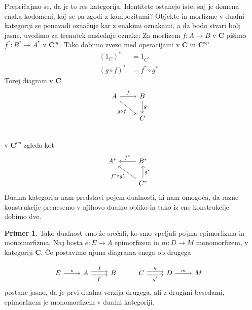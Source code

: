 \documentclass[12pt,a4paper]{book}
\theoremstyle{definition}
\theoremstyle{plain}
\theoremstyle{definition}
\newtheorem*{primer*}{Primer}
\theoremstyle{remark}
\newcommand{\cat}[1]{\textbf{#1}}
\begin{document}
Prepričajmo se, da je to res kategorija. Identitete ostanejo iste, saj je domena enaka kodomeni, kaj se pa zgodi z kompozitumi? Objekte in morfizme v dualni kategoriji se ponavadi označuje kar z enakimi oznakami, a da bodo stvari bolj jasne, uvedimo za trenutek naslednje oznake: Za morfizem $f : A \to B$ v $\cat{C}$ pišimo $f^* : B^* \to A^*$ v $\cat{C}^{op}$. Tako dobimo zvezo med operacijami v $\cat{C}$ in $\cat{C}^{op}$.
\begin{align*}
(1_C)^* &= 1_{C^*} \\
(g \circ f)^* &= f^* \circ g^*
\end{align*}
Torej diagram v $\cat{C}$
\[ \begin{tikzcd}
A \arrow[r, "f"] \arrow[rd, "g \circ f"'] & B \arrow[d, "g"] \\
&	C \\
\end{tikzcd} \]
%
v $\cat{C}^{op}$ zgleda kot
%
\[ \begin{tikzcd}
A^* & \arrow[l, "f^*"'] B^* \\
& \arrow[lu, "f^* \circ g^*"] C^* \arrow[u, "g^*"']
\end{tikzcd} \]
%
Dualna kategorija nam predstavi pojem dualnosti, ki nam omogoča, da razne konstrukcije prenesemo v njihovo dualno obliko in tako iz ene konstrukcije dobimo dve.

\begin{primer*}
Tako dualnost smo že srečali, ko smo vpeljali pojma epimorfizma in monomorfizma. Naj bosta $e : E \to A$ epimorfizem in $m : D \to M$ monomorfizem, v kategoriji $\cat{C}$. Če postavimo njuna diagrama enega ob drugega

\[ \begin{tikzcd}
E \ar[r, "e"] & A \ar[r, shift left, "f"] \ar[r, shift right, "f'"'] & B & C \ar[r, shift left, "g"] \ar[r, shift right, "g'"'] & D \ar[r, "m"] & M
\end{tikzcd} \]
postane jasno, da je prvi dualna verzija drugega, ali z drugimi besedami, epimorfizem je monomorfizem v dualni kategoriji.
\end{primer*}
\end{document}

